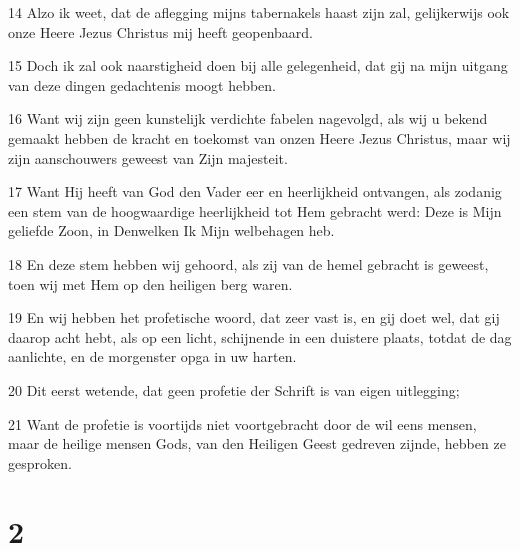 \par 14 Alzo ik weet, dat de aflegging mijns tabernakels haast zijn zal, gelijkerwijs ook onze Heere Jezus Christus mij heeft geopenbaard.
\par 15 Doch ik zal ook naarstigheid doen bij alle gelegenheid, dat gij na mijn uitgang van deze dingen gedachtenis moogt hebben.
\par 16 Want wij zijn geen kunstelijk verdichte fabelen nagevolgd, als wij u bekend gemaakt hebben de kracht en toekomst van onzen Heere Jezus Christus, maar wij zijn aanschouwers geweest van Zijn majesteit.
\par 17 Want Hij heeft van God den Vader eer en heerlijkheid ontvangen, als zodanig een stem van de hoogwaardige heerlijkheid tot Hem gebracht werd: Deze is Mijn geliefde Zoon, in Denwelken Ik Mijn welbehagen heb.
\par 18 En deze stem hebben wij gehoord, als zij van de hemel gebracht is geweest, toen wij met Hem op den heiligen berg waren.
\par 19 En wij hebben het profetische woord, dat zeer vast is, en gij doet wel, dat gij daarop acht hebt, als op een licht, schijnende in een duistere plaats, totdat de dag aanlichte, en de morgenster opga in uw harten.
\par 20 Dit eerst wetende, dat geen profetie der Schrift is van eigen uitlegging;
\par 21 Want de profetie is voortijds niet voortgebracht door de wil eens mensen, maar de heilige mensen Gods, van den Heiligen Geest gedreven zijnde, hebben ze gesproken.

\chapter{2}

